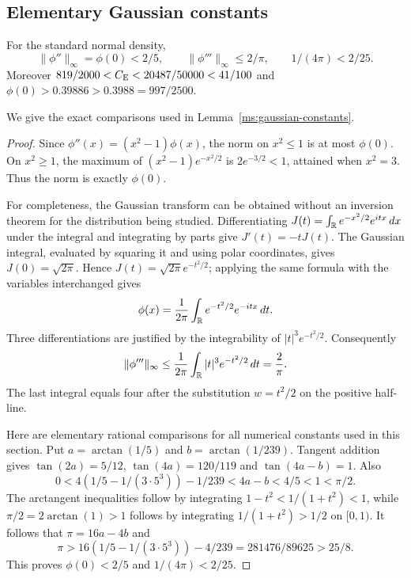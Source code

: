 \subsection{Elementary Gaussian constants}\label{ms:gaussian-constant-proof}
\begin{lemma}\label{ms:gaussian-constants}
For the standard normal density,
\[
 \|\phi''\|_\infty=\phi(0)<2/5,\qquad
 \|\phi'''\|_\infty\le2/\pi,\qquad 1/(4\pi)<2/25.
\]
Moreover $819/2000<C_{\mathrm E}<20487/50000<41/100$ and
$\phi(0)>0.39886>0.3988=997/2500$.
\end{lemma}
We give the exact comparisons used in Lemma~\ref{ms:gaussian-constants}.

\begin{proof}
Since $\phi''(x)=(x^2-1)\phi(x)$, the norm on $x^2\le1$ is at most
$\phi(0)$. On $x^2\ge1$, the maximum of
$(x^2-1)e^{-x^2/2}$ is $2e^{-3/2}<1$, attained when $x^2=3$.
Thus the norm is exactly $\phi(0)$.

For completeness, the Gaussian transform can be obtained without an
inversion theorem for the distribution being studied. Differentiating
$J(t)=\int_\mathbb R e^{-x^2/2}e^{itx}\,dx$ under the integral and integrating by
parts give $J'(t)=-tJ(t)$. The Gaussian integral, evaluated by squaring it
and using polar coordinates, gives $J(0)=\sqrt{2\pi}$. Hence
$J(t)=\sqrt{2\pi}e^{-t^2/2}$; applying the same formula with the variables
interchanged gives
\[
 \phi(x)=\frac1{2\pi}\int_\mathbb R e^{-t^2/2}e^{-itx}\,dt.
\]
Three differentiations are justified by the integrability of
$|t|^3e^{-t^2/2}$. Consequently
\[
 \|\phi'''\|_\infty
 \le\frac1{2\pi}\int_\mathbb R|t|^3e^{-t^2/2}\,dt=\frac2\pi.
\]
The last integral equals four after the substitution $w=t^2/2$ on the
positive half-line.

Here are elementary rational comparisons for all numerical constants used
in this section. Put $a=\arctan(1/5)$ and $b=\arctan(1/239)$.
Tangent addition gives $\tan(2a)=5/12$, $\tan(4a)=120/119$ and
$\tan(4a-b)=1$. Also
\[
 0<4(1/5-1/(3\cdot5^3))-1/239<4a-b<4/5<1<\pi/2.
\]
The arctangent inequalities follow by integrating
$1-t^2<1/(1+t^2)<1$, while $\pi/2=2\arctan(1)>1$ follows by integrating
$1/(1+t^2)>1/2$ on $[0,1)$. It follows that $\pi=16a-4b$ and
\[
 \pi>16(1/5-1/(3\cdot5^3))-4/239
      =281476/89625>25/8.
\]
This proves $\phi(0)<2/5$ and $1/(4\pi)<2/25$.


\end{proof}

